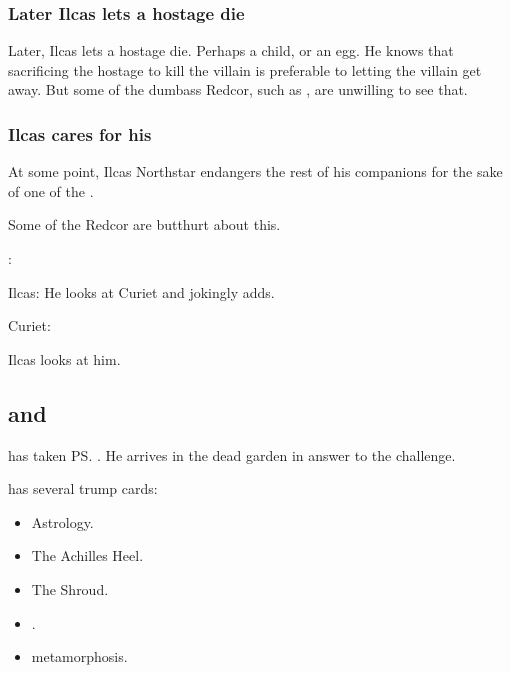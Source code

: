 \subsubsection{Later Ilcas lets a hostage die}
Later, Ilcas lets a hostage die. 
Perhaps a child, or an egg. 
He knows that sacrificing the hostage to kill the villain is preferable to letting the villain get away. 
But some of the dumbass Redcor, such as \Racel, are unwilling to see that. 





\subsubsection{Ilcas cares for his \nycans}
At some point, Ilcas Northstar endangers the rest of his companions for the sake of one of the \nycans. 

Some of the Redcor are butthurt about this.

\begin{prose}
  \Esmerel: 
  
  Ilcas: 
  He looks at Curiet and jokingly adds.
  
  Curiet:
  
  Ilcas looks at him.
\end{prose}









\subsection{\Teshrial and \Ishnaruchaefir}
\Ishnaruchaefir{} has taken \ps{\Teshrial} . 
He arrives in the dead garden in answer to the challenge. 

\Teshrial{} has several trump cards:
\begin{itemize}
  \item Astrology. 
  \item The Achilles Heel. 
  \item The Shroud.
  \item \Noggyaleth.
  \item \NeoResphan metamorphosis. 
\end{itemize}
    
